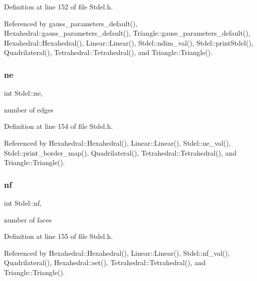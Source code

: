 Definition at line 152 of file Stdel.\+h.



Referenced by gauss\+\_\+parameters\+\_\+default(), Hexahedral\+::gauss\+\_\+parameters\+\_\+default(), Triangle\+::gauss\+\_\+parameters\+\_\+default(), Hexahedral\+::\+Hexahedral(), Linear\+::\+Linear(), Stdel\+::ndim\+\_\+val(), Stdel\+::print\+Stdel(), Quadrilateral(), Tetrahedral\+::\+Tetrahedral(), and Triangle\+::\+Triangle().

\mbox{\label{classStdel_aef3d1b34184b9fd03c0b655640c243b6}} 
\subsubsection{\texorpdfstring{ne}{ne}}
{\footnotesize\ttfamily int Stdel\+::ne\hspace{0.3cm}{\ttfamily [protected]}, {\ttfamily [inherited]}}



number of edges 



Definition at line 154 of file Stdel.\+h.



Referenced by Hexahedral\+::\+Hexahedral(), Linear\+::\+Linear(), Stdel\+::ne\+\_\+val(), Stdel\+::print\+\_\+border\+\_\+map(), Quadrilateral(), Tetrahedral\+::\+Tetrahedral(), and Triangle\+::\+Triangle().

\mbox{\label{classStdel_a61987080026986a40412a8937aad4b24}} 
\subsubsection{\texorpdfstring{nf}{nf}}
{\footnotesize\ttfamily int Stdel\+::nf\hspace{0.3cm}{\ttfamily [protected]}, {\ttfamily [inherited]}}



number of faces 



Definition at line 155 of file Stdel.\+h.



Referenced by Hexahedral\+::\+Hexahedral(), Linear\+::\+Linear(), Stdel\+::nf\+\_\+val(), Quadrilateral(), Hexahedral\+::set(), Tetrahedral\+::\+Tetrahedral(), and Triangle\+::\+Triangle().

